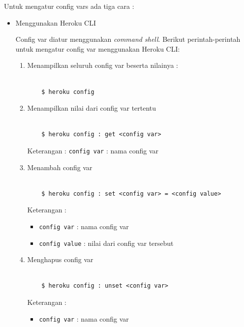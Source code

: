 \documentclass[a4paper,twoside]{article}
\begin{document}
\begin{enumerate}
\begin{enumerate}
\begin{itemize}
Untuk mengatur config vars ada tiga cara : 
\begin{itemize}
\item Menggunakan Heroku CLI

Config var diatur menggunakan \textit{command shell}. Berikut perintah-perintah untuk mengatur config var menggunakan Heroku CLI:
\begin{enumerate}
\item Menampilkan seluruh config var beserta nilainya : 

\begin{lstlisting}

	$ heroku config

\end{lstlisting}

\item Menampilkan nilai dari config var tertentu 
\begin{lstlisting}

	$ heroku config : get <config var>

\end{lstlisting}
Keterangan :
\texttt{config var} : nama config var


\item Menambah config var

\begin{lstlisting}

	$ heroku config : set <config var> = <config value>

\end{lstlisting}
Keterangan :
\begin{itemize}
\item \texttt{config var} : nama config var
\item \texttt{config value} : nilai dari config var tersebut
\end{itemize}

\item Menghapus config var

\begin{lstlisting}

	$ heroku config : unset <config var>

\end{lstlisting}
Keterangan :
\begin{itemize}
\item \texttt{config var} : nama config var
\end{itemize}

\end{enumerate}


\end{itemize}
\end{itemize}
\end{enumerate}
\end{enumerate}
\end{document}
